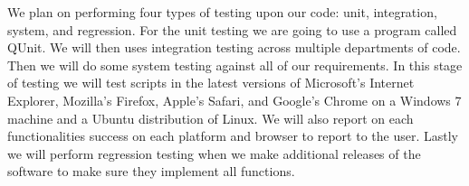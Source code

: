 We plan on performing four types of testing upon our code: unit, integration, system, and regression. For the unit testing we are going to use a program called QUnit. We will then uses integration testing across multiple departments of code. Then we will do some system testing against all of our requirements. In this stage of testing we will test scripts in the latest versions of Microsoft’s Internet Explorer, Mozilla’s Firefox, Apple’s Safari, and Google’s Chrome on a Windows 7 machine and a Ubuntu distribution of Linux. We will also report on each functionalities success on each platform and browser to report to the user. Lastly we will perform regression testing when we make additional releases of the software to make sure they implement all functions.

\newpage